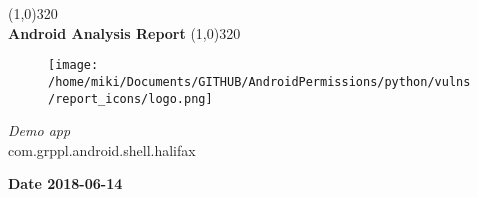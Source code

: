 \documentclass[12p]{article}
\begin{document}
\begin{titlepage}
\begin{center}
\line(1,0){320}\\
[0.25in]
\huge{\bfseries Android Analysis Report}
\line(1,0){320}\\
[0.5in]
\begin{figure}[H]
	\centering
	\texttt{[image: /home/miki/Documents/GITHUB/AndroidPermissions/python/vulns/report\_icons/logo.png]}
\end{figure}
\textsl{\LARGE Demo app}\\
\textsf{\LARGE com.grppl.android.shell.halifax}\\
[2.5in]
\end{center}
\begin{flushright}
\textbf{\large Date 2018-06-14}
\end{flushright}
\end{titlepage}
\tableofcontents
\thispagestyle{empty}
\cleardoublepage
\setcounter{page}{1}
\end{document}
